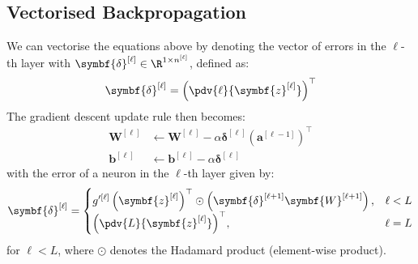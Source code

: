 \documentclass{article}
\begin{document}
\subsection{Vectorised Backpropagation}
We can vectorise the equations above by denoting the vector of errors
in the \(\ell\)-th layer with \(\symbf{\delta}^{\left[ \ell \right]}
\in \R^{1 \times n^{\left[ \ell \right]}}\), defined as:
\begin{equation*}
    \symbf{\delta}^{\left[ \ell \right]} = {\left( \pdv{\ell}{\symbf{z}^{\left[ \ell \right]}} \right)}^\top
\end{equation*}
The gradient descent update rule then becomes:
\begin{align*}
    \symbf{W}^{\left[ \ell \right]} & \leftarrow \symbf{W}^{\left[ \ell \right]} - \alpha \symbf{\delta}^{\left[ \ell \right]} {\left( \symbf{a}^{\left[ \ell - 1 \right]} \right)}^\top \\
    \symbf{b}^{\left[ \ell \right]} & \leftarrow \symbf{b}^{\left[ \ell \right]} - \alpha \symbf{\delta}^{\left[ \ell \right]}
\end{align*}
with the error of a neuron in the \(\ell\)-th layer given by:
\begin{equation*}
    \symbf{\delta}^{\left[ \ell \right]} =
    \begin{cases}
        \displaystyle {g^{\prime\left[ \ell \right]}\left( \symbf{z}^{\left[ \ell \right]} \right)}^\top \odot \left( \symbf{\delta}^{\left[ \ell + 1 \right]} \symbf{W}^{\left[ \ell + 1 \right]} \right), & \ell < L \\
        \displaystyle {\left( \pdv{L}{\symbf{z}^{\left[ \ell \right]}} \right)}^\top,                                                                                                                       & \ell = L \\
    \end{cases}
\end{equation*}
for \(\ell < L\), where \(\odot\) denotes the Hadamard product
(element-wise product).
\end{document}
